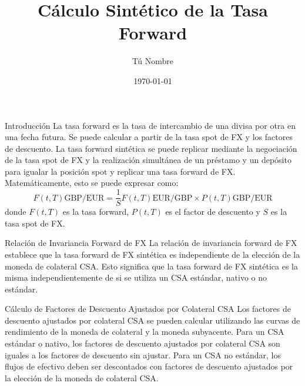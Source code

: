 \documentclass{beamer}
\title{Cálculo Sintético de la Tasa Forward}
\author{Tú Nombre}
\date{\today}
\begin{document}
	
	\begin{frame}
		\titlepage
	\end{frame}
	
	\begin{frame}{Introducción}
		La tasa forward es la tasa de intercambio de una divisa por otra en una fecha futura. Se puede calcular a partir de la tasa spot de FX y los factores de descuento. La tasa forward sintética se puede replicar mediante la negociación de la tasa spot de FX y la realización simultánea de un préstamo y un depósito para igualar la posición spot y replicar una tasa forward de FX. Matemáticamente, esto se puede expresar como:
		\[
		F(t,T)\text{GBP/EUR} = \frac{1}{S} F(t,T)\text{EUR/GBP} \times P(t,T)\text{GBP/EUR}
		\]
		donde $F(t,T)$ es la tasa forward, $P(t,T)$ es el factor de descuento y $S$ es la tasa spot de FX.
	\end{frame}
	
	\begin{frame}{Relación de Invariancia Forward de FX}
		La relación de invariancia forward de FX establece que la tasa forward de FX sintética es independiente de la elección de la moneda de colateral CSA. Esto significa que la tasa forward de FX sintética es la misma independientemente de si se utiliza un CSA estándar, nativo o no estándar.
	\end{frame}
	
	\begin{frame}{Cálculo de Factores de Descuento Ajustados por Colateral CSA}
		Los factores de descuento ajustados por colateral CSA se pueden calcular utilizando las curvas de rendimiento de la moneda de colateral y la moneda subyacente. Para un CSA estándar o nativo, los factores de descuento ajustados por colateral CSA son iguales a los factores de descuento sin ajustar. Para un CSA no estándar, los flujos de efectivo deben ser descontados con factores de descuento ajustados por la elección de la moneda de colateral CSA.
	\end{frame}
	
\end{document}
